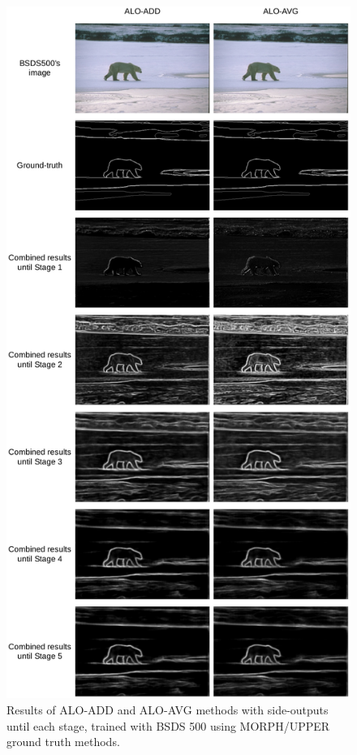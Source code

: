 \begin{figure}%
  \centering
  \includegraphics[width=1\columnwidth]{../imagens/ilustracoes/cap6_bsds_stage_results.png} %
  \caption{Results of ALO-ADD and ALO-AVG methods with side-outputs until each stage, trained with BSDS 500 using MORPH/UPPER ground truth methods.}
  \label{fig:bsds_stage_results}
\end{figure}

